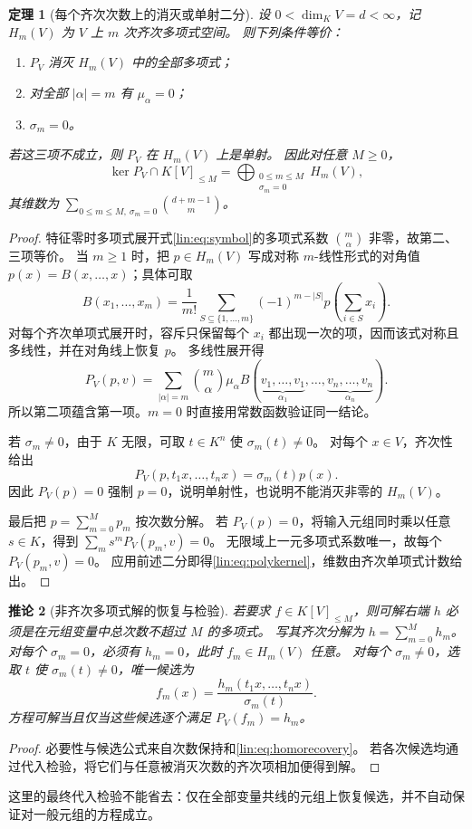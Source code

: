 \documentclass[11pt,a4paper,oneside,openany]{book}
\theoremstyle{lecture}
\newtheorem{theorem}{定理}[section]
\newtheorem{corollary}[theorem]{推论}
\numberwithin{equation}{section}
\begin{document}
\begin{theorem}[每个齐次次数上的消灭或单射二分]\label{lin:thm:moment}
设 $0<\dim_KV=d<\infty$，记 $H_m(V)$ 为 $V$ 上 $m$ 次齐次多项式空间。
则下列条件等价：
\begin{enumerate}
\item $P_V$ 消灭 $H_m(V)$ 中的全部多项式；
\item 对全部 $|\alpha|=m$ 有 $\mu_\alpha=0$；
\item $\sigma_m=0$。
\end{enumerate}
若这三项不成立，则 $P_V$ 在 $H_m(V)$ 上是单射。
因此对任意 $M\ge0$，
\begin{equation}\label{lin:eq:polykernel}
 \ker P_V\cap K[V]_{\le M}
 =\bigoplus_{\substack{0\le m\le M\\\sigma_m=0}}H_m(V),
\end{equation}
其维数为 $\sum_{0\le m\le M,\ \sigma_m=0}\binom{d+m-1}{m}$。
\end{theorem}
\begin{proof}
特征零时多项式展开式\eqref{lin:eq:symbol}的多项式系数 $\binom m\alpha$ 非零，故第二、三项等价。
当 $m\ge1$ 时，把 $p\in H_m(V)$ 写成对称 $m$-线性形式的对角值 $p(x)=B(x,\ldots,x)$；具体可取
\[
 B(x_1,\ldots,x_m)=\frac1{m!}\sum_{S\subseteq\{1,\ldots,m\}}
 (-1)^{m-|S|}p\left(\sum_{i\in S}x_i\right).
\]
对每个齐次单项式展开时，容斥只保留每个 $x_i$ 都出现一次的项，因而该式对称且多线性，并在对角线上恢复 $p$。
多线性展开得
\[
 P_V(p,v)=\sum_{|\alpha|=m}\binom m\alpha\mu_\alpha
 B(\underbrace{v_1,\ldots,v_1}_{\alpha_1},\ldots,
   \underbrace{v_n,\ldots,v_n}_{\alpha_n}).
\]
所以第二项蕴含第一项。$m=0$ 时直接用常数函数验证同一结论。

若 $\sigma_m\ne0$，由于 $K$ 无限，可取 $t\in K^n$ 使 $\sigma_m(t)\ne0$。
对每个 $x\in V$，齐次性给出
\begin{equation}\label{lin:eq:homorecovery}
 P_V(p,t_1x,\ldots,t_nx)=\sigma_m(t)p(x).
\end{equation}
因此 $P_V(p)=0$ 强制 $p=0$，说明单射性，也说明不能消灭非零的 $H_m(V)$。

最后把 $p=\sum_{m=0}^M p_m$ 按次数分解。
若 $P_V(p)=0$，将输入元组同时乘以任意 $s\in K$，得到
$\sum_m s^mP_V(p_m,v)=0$。
无限域上一元多项式系数唯一，故每个 $P_V(p_m,v)=0$。
应用前述二分即得\eqref{lin:eq:polykernel}，维数由齐次单项式计数给出。
\end{proof}

\begin{corollary}[非齐次多项式解的恢复与检验]\label{lin:cor:polyrecover}
若要求 $f\in K[V]_{\le M}$，则可解右端 $h$ 必须是在元组变量中总次数不超过 $M$ 的多项式。
写其齐次分解为 $h=\sum_{m=0}^M h_m$。
对每个 $\sigma_m=0$，必须有 $h_m=0$，此时 $f_m\in H_m(V)$ 任意。
对每个 $\sigma_m\ne0$，选取 $t$ 使 $\sigma_m(t)\ne0$，唯一候选为
\[
 f_m(x)=\frac{h_m(t_1x,\ldots,t_nx)}{\sigma_m(t)}.
\]
方程可解当且仅当这些候选逐个满足 $P_V(f_m)=h_m$。
\end{corollary}
\begin{proof}
必要性与候选公式来自次数保持和\eqref{lin:eq:homorecovery}。
若各次候选均通过代入检验，将它们与任意被消灭次数的齐次项相加便得到解。
\end{proof}
这里的最终代入检验不能省去：仅在全部变量共线的元组上恢复候选，并不自动保证对一般元组的方程成立。
\end{document}

